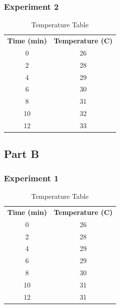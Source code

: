 \documentclass[a4paper, 12pt, english]{article}
\begin{document}
\subsubsection{Experiment 2}
\begin{table}[H]
	\caption{\label{tab:Table 2} Temperature Table}
	\centering
	\begin{tabular}{c c}
		\toprule
		\textbf{Time (min)}
		   & \textbf{Temperature (\degree C)} \\
		\cmidrule[0.4pt](r{0.125em}){1-1}%
		\cmidrule[0.4pt](lr{0.125em}){2-2}%
		0  & 26                               \\
		2  & 28                               \\
		4  & 29                               \\
		6  & 30                               \\
		8  & 31                               \\
		10 & 32                               \\
		12 & 33                               \\
		\bottomrule
	\end{tabular}
\end{table}

\subsection{Part B}
\subsubsection{Experiment 1}
\begin{table}[H]
	\caption{\label{tab:Table 3} Temperature Table}
	\centering
	\begin{tabular}{c c}
		\toprule
		\textbf{Time (min)}
		   & \textbf{Temperature (\degree C)} \\
		\cmidrule[0.4pt](r{0.125em}){1-1}%
		\cmidrule[0.4pt](lr{0.125em}){2-2}%
		0  & 26                               \\
		2  & 28                               \\
		4  & 29                               \\
		6  & 29                               \\
		8  & 30                               \\
		10 & 31                               \\
		12 & 31                               \\
		\bottomrule
	\end{tabular}
\end{table}
\end{document}
